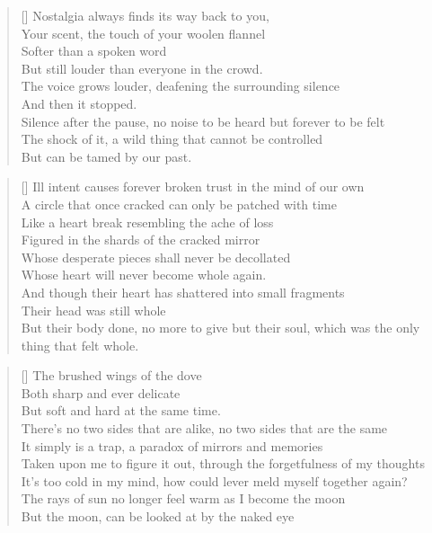 \settowidth{\versewidth}{Silence after the pause, no noise to be heard but forever to be felt}
\begin{verse}[\versewidth]
Nostalgia always finds its way back to you,\\
Your scent, the touch of your woolen flannel \\
Softer than a spoken word\\
But still louder than everyone in the crowd.\\
The voice grows louder, deafening the surrounding silence\\
And then it stopped. \\
Silence after the pause, no noise to be heard but forever to be felt\\
The shock of it, a wild thing that cannot be controlled\\
But can be tamed by our past.\\
\end{verse}

\clearpage
{}
\settowidth{\versewidth}{Ill intent causes forever broken trust in the mind of our own}
\begin{verse}[\versewidth]
Ill intent causes forever broken trust in the mind of our own\\
A circle that once cracked can only be patched with time\\
Like a heart break resembling the ache of loss\\
Figured in the shards of the cracked mirror\\
Whose desperate pieces shall never be decollated \\
Whose heart will never become whole again.\\
And though their heart has shattered into small fragments\\
Their head was still whole\\
But their body done, no more to give but their soul, which was the only thing that felt whole.\\
\end{verse}

\settowidth{\versewidth}{Taken upon me to figure it out, through the forgetfulness of my thoughts}
\begin{verse}[\versewidth]
The brushed wings of the dove \\
Both sharp and ever delicate \\
But soft and hard at the same time.\\
There’s no two sides that are alike, no two sides that are the same\\
It simply is a trap, a paradox of mirrors and memories \\
Taken upon me to figure it out, through the forgetfulness of my thoughts\\
It’s too cold in my mind, how could lever meld myself together again?\\
The rays of sun no longer feel warm as I become the moon\\
But the moon, can be looked at by the naked eye \\
\end{verse}

